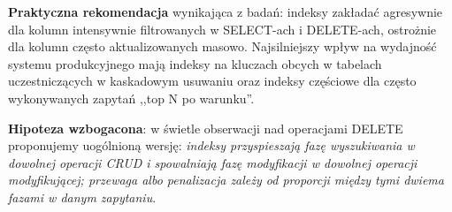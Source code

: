 \textbf{Praktyczna rekomendacja} wynikająca z badań: indeksy zakładać
agresywnie dla kolumn intensywnie filtrowanych w SELECT-ach
i DELETE-ach, ostrożnie dla kolumn często aktualizowanych masowo.
Najsilniejszy wpływ na wydajność systemu produkcyjnego mają indeksy
na kluczach obcych w tabelach uczestniczących w kaskadowym usuwaniu
oraz indeksy częściowe dla często wykonywanych zapytań ,,top N po
warunku''.

\textbf{Hipoteza wzbogacona}: w świetle obserwacji nad operacjami
DELETE proponujemy uogólnioną wersję: \emph{indeksy przyspieszają
fazę wyszukiwania w dowolnej operacji CRUD i spowalniają fazę
modyfikacji w dowolnej operacji modyfikującej; przewaga albo
penalizacja zależy od proporcji między tymi dwiema fazami w danym
zapytaniu}.
